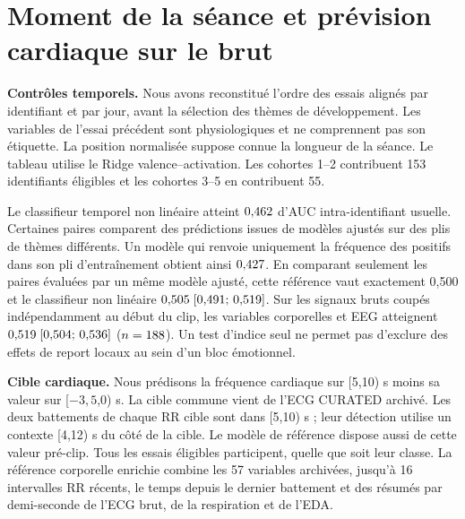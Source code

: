 \documentclass[10pt,a4paper]{article}
\begin{document}
\section{Moment de la séance et prévision cardiaque sur le brut}
\textbf{Contrôles temporels.} Nous avons reconstitué l’ordre des essais alignés par identifiant et par jour, avant la sélection des thèmes de développement. Les variables de l’essai précédent sont physiologiques et ne comprennent pas son étiquette. La position normalisée suppose connue la longueur de la séance. Le tableau utilise le Ridge valence--activation. Les cohortes 1--2 contribuent 153 identifiants éligibles et les cohortes 3--5 en contribuent 55.
\begin{center}\small\OrderTable\end{center}
Le classifieur temporel non linéaire atteint $0{,}462$ d’AUC intra-identifiant usuelle. Certaines paires comparent des prédictions issues de modèles ajustés sur des plis de thèmes différents. Un modèle qui renvoie uniquement la fréquence des positifs dans son pli d’entraînement obtient ainsi $0{,}427$. En comparant seulement les paires évaluées par un même modèle ajusté, cette référence vaut exactement 0,500 et le classifieur non linéaire $0{,}505\;[0{,}491;\,0{,}519]$. Sur les signaux bruts coupés indépendamment au début du clip, les variables corporelles et EEG atteignent $0{,}519\;[0{,}504;\,0{,}536]$ ($n=188$). Un test d’indice seul ne permet pas d’exclure des effets de report locaux au sein d’un bloc émotionnel.

\textbf{Cible cardiaque.} Nous prédisons la fréquence cardiaque sur [5,10) s moins sa valeur sur [$-3{,}5$,0) s. La cible commune vient de l’ECG CURATED archivé. Les deux battements de chaque RR cible sont dans [5,10) s ; leur détection utilise un contexte [4,12) s du côté de la cible. Le modèle de référence dispose aussi de cette valeur pré-clip. Tous les essais éligibles participent, quelle que soit leur classe. La référence corporelle enrichie combine les 57 variables archivées, jusqu’à 16 intervalles RR récents, le temps depuis le dernier battement et des résumés par demi-seconde de l’ECG brut, de la respiration et de l’EDA.
\end{document}
